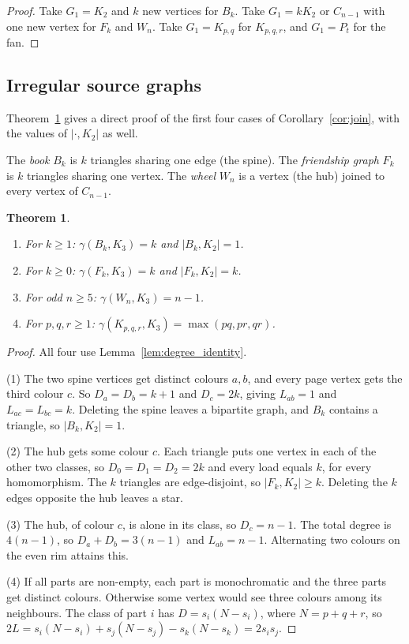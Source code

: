 \documentclass{article}
\newtheorem{theorem}{Theorem}[section]
\theoremstyle{definition}
\begin{document}
\begin{proof}
Take $G_1=K_2$ and $k$ new vertices for $B_k$.  Take $G_1=kK_2$ or $C_{n-1}$ with
one new vertex for $F_k$ and $W_n$.  Take $G_1=K_{p,q}$ for $K_{p,q,r}$, and
$G_1=P_t$ for the fan.
\end{proof}

\subsection{Irregular source graphs}

Theorem~\ref{thm:families} gives a direct proof of the first four cases of
Corollary~\ref{cor:join}, with the values of $|\cdot,K_2|$ as well.

The \emph{book} $B_k$ is $k$ triangles sharing one edge (the spine).  The
\emph{friendship graph} $F_k$ is $k$ triangles sharing one vertex.  The
\emph{wheel} $W_n$ is a vertex (the hub) joined to every vertex of $C_{n-1}$.

\begin{theorem}
\label{thm:families}
\begin{enumerate}
  \item For $k\ge1$: $\gamma(B_k,K_3)=k$ and $|B_k,K_2|=1$.
  \item For $k\ge0$: $\gamma(F_k,K_3)=k$ and $|F_k,K_2|=k$.
  \item For odd $n\ge5$: $\gamma(W_n,K_3)=n-1$.
  \item For $p,q,r\ge1$: $\gamma(K_{p,q,r},K_3)=\max(pq,pr,qr)$.
\end{enumerate}
\end{theorem}

\begin{proof}
All four use Lemma~\ref{lem:degree_identity}.

(1) The two spine vertices get distinct colours $a,b$, and every page vertex gets
the third colour $c$.  So $D_a=D_b=k+1$ and $D_c=2k$, giving $L_{ab}=1$ and
$L_{ac}=L_{bc}=k$.  Deleting the spine leaves a bipartite graph, and $B_k$
contains a triangle, so $|B_k,K_2|=1$.

(2) The hub gets some colour $c$.  Each triangle puts one vertex in each of the
other two classes, so $D_0=D_1=D_2=2k$ and every load equals $k$, for every
homomorphism.  The $k$ triangles are edge-disjoint, so $|F_k,K_2|\ge k$.
Deleting the $k$ edges opposite the hub leaves a star.

(3) The hub, of colour $c$, is alone in its class, so $D_c=n-1$.  The total degree
is $4(n-1)$, so $D_a+D_b=3(n-1)$ and $L_{ab}=n-1$.  Alternating two colours on
the even rim attains this.

(4) If all parts are non-empty, each part is monochromatic and the three parts
get distinct colours.  Otherwise some vertex would see three colours among its
neighbours.  The class of part $i$ has $D=s_i(N-s_i)$, where $N=p+q+r$, so
$2L=s_i(N-s_i)+s_j(N-s_j)-s_k(N-s_k)=2s_is_j$.
\end{proof}
\end{document}
